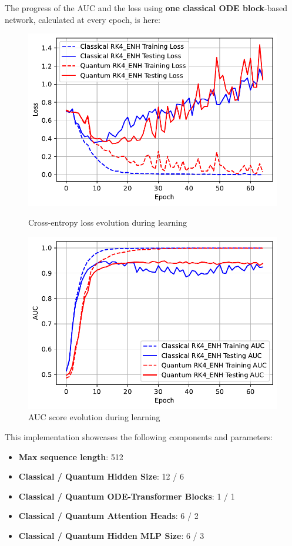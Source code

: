 \documentclass[12pt,a4paper]{report}
\begin{document}
\clearpage

The progress of the AUC and the loss using \textbf{one classical ODE block}-based network, calculated at every epoch, is here:

\begin{figure}[th]
  \centering
  \includegraphics[scale=0.88]{./pics/new_pdf_graphs/hybrid/hybrid_transfomer_loss_imdb_rk4_enh.pdf}
  \caption[Cross-entropy loss evolution during learning]{Cross-entropy loss evolution during learning}
  \label{fig:p37}
  \vspace*{\floatsep}
  \centering
  \includegraphics[scale=0.88]{./pics/new_pdf_graphs/hybrid/hybrid_auc_imdb_.pdf}
  \caption[AUC score evolution during learning]{AUC score evolution during learning}
  \label{fig:p38}
\end{figure}

This implementation showcases the following components and parameters:
\begin{itemize}
  \item \textbf{Max sequence length}: 512
  \item \textbf{Classical / Quantum Hidden Size}: 12 / 6
  \item \textbf{Classical / Quantum ODE-Transformer Blocks}: 1 / 1
  \item \textbf{Classical / Quantum Attention Heads}: 6 / 2
  \item \textbf{Classical / Quantum Hidden MLP Size}: 6 / 3
\end{itemize}
\end{document}
